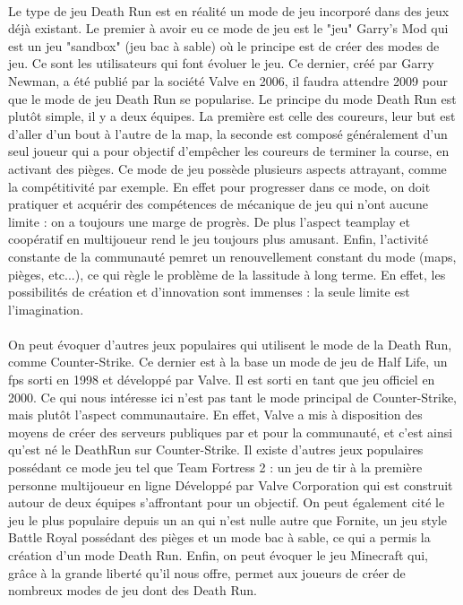 \documentclass[12pt]{report}
\begin{document}
	\paragraph{}
	Le type de jeu Death Run est en réalité un mode de jeu incorporé dans des jeux déjà existant. Le premier à avoir eu ce mode de jeu est le "jeu" Garry's Mod qui est un jeu "sandbox" (jeu bac à sable) où le principe est de créer des modes de jeu. Ce sont les utilisateurs qui font évoluer le jeu. Ce dernier, créé par Garry Newman, a été publié par la société Valve en 2006, il faudra attendre 2009 pour que le mode de jeu Death Run se popularise. Le principe du mode Death Run est plutôt simple, il y a deux équipes. La première est celle des coureurs, leur but est d'aller d'un bout à l'autre de la map, la seconde est composé généralement d'un seul joueur qui a pour objectif d'empêcher les coureurs de terminer la course, en activant des pièges. Ce mode de jeu possède plusieurs aspects attrayant, comme la compétitivité par exemple. En effet pour progresser dans ce mode, on doit pratiquer et acquérir des compétences de mécanique de jeu qui n'ont aucune limite : on a toujours une marge de progrès. De plus l'aspect teamplay et coopératif en multijoueur rend le jeu toujours plus amusant. Enfin, l'activité constante de la communauté pemret un renouvellement constant du mode (maps, pièges, etc...), ce qui règle le problème de la lassitude à long terme. En effet, les possibilités de création et d'innovation sont immenses : la seule limite est l'imagination.
	\paragraph{}
	On peut évoquer d'autres jeux populaires qui utilisent le mode de la Death Run, comme Counter-Strike. Ce dernier est à la base un mode de jeu de Half Life, un fps sorti en 1998 et développé par Valve. Il est sorti en tant que jeu officiel en 2000. Ce qui nous intéresse ici n'est pas tant le mode principal de Counter-Strike, mais plutôt l'aspect communautaire. En effet, Valve a mis à disposition des moyens de créer des serveurs publiques par et pour la communauté, et c'est ainsi qu'est né le DeathRun sur Counter-Strike.
	Il existe d'autres jeux populaires possédant ce mode jeu tel que Team Fortress 2 : un jeu de tir à la première personne multijoueur en ligne Développé par Valve Corporation qui est construit autour de deux équipes s'affrontant pour un objectif. On peut également cité le jeu le plus populaire depuis un an qui n'est nulle autre que Fornite, un jeu style Battle Royal possédant des pièges et un mode bac à sable, ce qui a permis la création d'un mode Death Run. Enfin, on peut évoquer le jeu Minecraft qui, grâce à la grande liberté qu'il nous offre, permet aux joueurs de créer de nombreux modes de jeu dont des Death Run.
\end{document}
